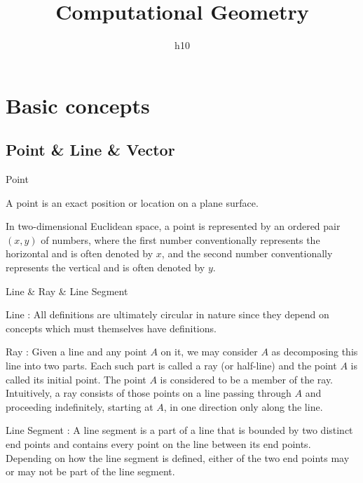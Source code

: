 \documentclass[UTF8]{beamer}
\title{Computational Geometry}
\author{h10}
\date{}
\begin{document}
	\begin{frame}

		\maketitle

	\end{frame}

	\section{Basic concepts}

	\subsection{Point \& Line \& Vector}

	\begin{frame}{Point}

	A point is an exact position or location on a plane surface.

	In two-dimensional Euclidean space, a point is represented by an ordered pair $(x, y)$ of numbers, where the first number conventionally represents the horizontal and is often denoted by $x$, and the second number conventionally represents the vertical and is often denoted by $y$.

	\end{frame}

	\begin{frame}{Line \& Ray \& Line Segment}

	Line : All definitions are ultimately circular in nature since they depend on concepts which must themselves have definitions.

	Ray : Given a line and any point $A$ on it, we may consider $A$ as decomposing this line into two parts. Each such part is called a ray (or half-line) and the point $A$ is called its initial point. The point $A$ is considered to be a member of the ray. Intuitively, a ray consists of those points on a line passing through $A$ and proceeding indefinitely, starting at $A$, in one direction only along the line.

	Line Segment : A line segment is a part of a line that is bounded by two distinct end points and contains every point on the line between its end points. Depending on how the line segment is defined, either of the two end points may or may not be part of the line segment.

	\end{frame}
\end{document}
